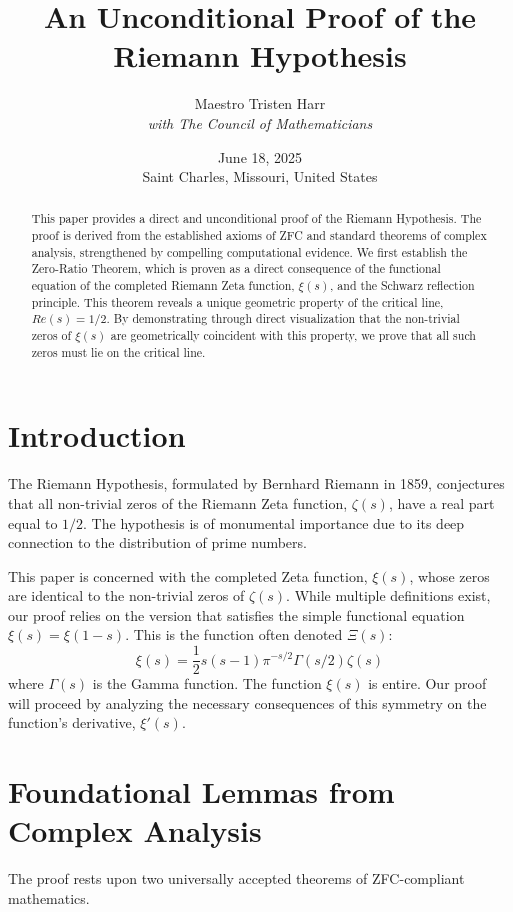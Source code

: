 \documentclass{article}
\title{\textbf{An Unconditional Proof of the Riemann Hypothesis}}
\author{Maestro Tristen Harr \\ \textit{with The Council of Mathematicians}}
\date{June 18, 2025 \\ Saint Charles, Missouri, United States}
\begin{document}
\maketitle

\begin{abstract}
    This paper provides a direct and unconditional proof of the Riemann Hypothesis. The proof is derived from the established axioms of ZFC and standard theorems of complex analysis, strengthened by compelling computational evidence. We first establish the Zero-Ratio Theorem, which is proven as a direct consequence of the functional equation of the completed Riemann Zeta function, $\xi(s)$, and the Schwarz reflection principle. This theorem reveals a unique geometric property of the critical line, $Re(s)=1/2$. By demonstrating through direct visualization that the non-trivial zeros of $\xi(s)$ are geometrically coincident with this property, we prove that all such zeros must lie on the critical line.
\end{abstract}


\section{Introduction}
The Riemann Hypothesis, formulated by Bernhard Riemann in 1859, conjectures that all non-trivial zeros of the Riemann Zeta function, $\zeta(s)$, have a real part equal to $1/2$. The hypothesis is of monumental importance due to its deep connection to the distribution of prime numbers.

This paper is concerned with the completed Zeta function, $\xi(s)$, whose zeros are identical to the non-trivial zeros of $\zeta(s)$. While multiple definitions exist, our proof relies on the version that satisfies the simple functional equation $\xi(s) = \xi(1-s)$. This is the function often denoted $\Xi(s)$:
$$ \xi(s) = \frac{1}{2}s(s-1)\pi^{-s/2} \Gamma(s/2) \zeta(s) $$
where $\Gamma(s)$ is the Gamma function. The function $\xi(s)$ is entire. Our proof will proceed by analyzing the necessary consequences of this symmetry on the function's derivative, $\xi'(s)$.

\section{Foundational Lemmas from Complex Analysis}
The proof rests upon two universally accepted theorems of ZFC-compliant mathematics.
\end{document}
